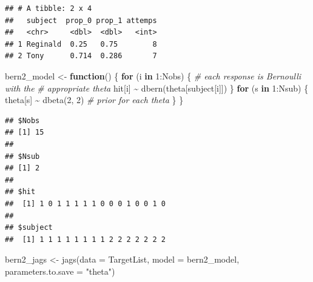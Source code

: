 \documentclass[
  12pt,
]{book}
\newenvironment{Shaded}{\begin{snugshade}}{\end{snugshade}}
\newcommand{\AttributeTok}[1]{\textcolor[rgb]{0.77,0.63,0.00}{#1}}
\newcommand{\CommentTok}[1]{\textcolor[rgb]{0.56,0.35,0.01}{\textit{#1}}}
\newcommand{\ControlFlowTok}[1]{\textcolor[rgb]{0.13,0.29,0.53}{\textbf{#1}}}
\newcommand{\DecValTok}[1]{\textcolor[rgb]{0.00,0.00,0.81}{#1}}
\newcommand{\FunctionTok}[1]{\textcolor[rgb]{0.00,0.00,0.00}{#1}}
\newcommand{\NormalTok}[1]{#1}
\newcommand{\OtherTok}[1]{\textcolor[rgb]{0.56,0.35,0.01}{#1}}
\newcommand{\SpecialCharTok}[1]{\textcolor[rgb]{0.00,0.00,0.00}{#1}}
\newcommand{\StringTok}[1]{\textcolor[rgb]{0.31,0.60,0.02}{#1}}
\theoremstyle{definition}
\theoremstyle{definition}
\theoremstyle{definition}
\theoremstyle{definition}
\theoremstyle{remark}
\begin{document}
\begin{verbatim}
## # A tibble: 2 x 4
##   subject  prop_0 prop_1 attemps
##   <chr>     <dbl>  <dbl>   <int>
## 1 Reginald  0.25   0.75        8
## 2 Tony      0.714  0.286       7
\end{verbatim}

\begin{Shaded}
\begin{Highlighting}[]
\NormalTok{bern2\_model }\OtherTok{\textless{}{-}} \ControlFlowTok{function}\NormalTok{() \{}
    \ControlFlowTok{for}\NormalTok{ (i }\ControlFlowTok{in} \DecValTok{1}\SpecialCharTok{:}\NormalTok{Nobs) \{}
        \CommentTok{\# each response is Bernoulli with the}
        \CommentTok{\# appropriate theta}
\NormalTok{        hit[i] }\SpecialCharTok{\textasciitilde{}} \FunctionTok{dbern}\NormalTok{(theta[subject[i]])}
\NormalTok{    \}}
    \ControlFlowTok{for}\NormalTok{ (s }\ControlFlowTok{in} \DecValTok{1}\SpecialCharTok{:}\NormalTok{Nsub) \{}
\NormalTok{        theta[s] }\SpecialCharTok{\textasciitilde{}} \FunctionTok{dbeta}\NormalTok{(}\DecValTok{2}\NormalTok{, }\DecValTok{2}\NormalTok{)  }\CommentTok{\# prior for each theta}
\NormalTok{    \}}
\NormalTok{\}}
\end{Highlighting}
\end{Shaded}

\begin{Shaded}
\end{Shaded}

\begin{verbatim}
## $Nobs
## [1] 15
## 
## $Nsub
## [1] 2
## 
## $hit
##  [1] 1 0 1 1 1 1 1 0 0 0 1 0 0 1 0
## 
## $subject
##  [1] 1 1 1 1 1 1 1 1 2 2 2 2 2 2 2
\end{verbatim}

\begin{Shaded}
\begin{Highlighting}[]
\NormalTok{bern2\_jags }\OtherTok{\textless{}{-}} \FunctionTok{jags}\NormalTok{(}\AttributeTok{data =}\NormalTok{ TargetList, }\AttributeTok{model =}\NormalTok{ bern2\_model,}
    \AttributeTok{parameters.to.save =} \StringTok{"theta"}\NormalTok{)}
\end{Highlighting}
\end{Shaded}
\end{document}
